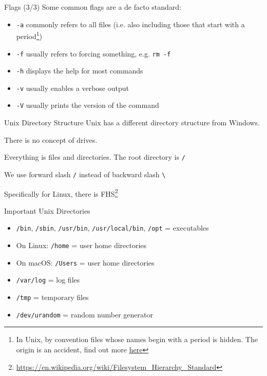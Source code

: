 \documentclass[12pt]{beamer}
\begin{document}
\begin{frame}[fragile]{Flags (3/3)}
  Some common flags are a de facto standard:
  \begin{itemize}
    \item \texttt{-a} commonly refers to all files (i.e. also including those that start with a period\footnote{In Unix, by convention files whose names begin with a period is hidden. The origin is an accident, find out more \href{https://web.archive.org/web/20150310215704if_/https://plus.google.com/+RobPikeTheHuman/posts/R58WgWwN9jp}{\underline{here}}})
    \item \texttt{-f} usually refers to forcing something, e.g. \texttt{rm -f}
    \item \texttt{-h} displays the help for most commands
    \item \texttt{-v} usually enables a verbose output
    \item \texttt{-V} usually prints the version of the command
  \end{itemize}
\end{frame}

\begin{frame}{Unix Directory Structure}
  Unix has a different directory structure from Windows.

  There is no concept of drives.

  Everything is files and directories. The root directory is \texttt{/}

  We use forward slash \texttt{/} instead of backward slash \texttt{\textbackslash}

  Specifically for Linux, there is FHS\footnote{\url{https://en.wikipedia.org/wiki/Filesystem_Hierarchy_Standard}}
\end{frame}

\begin{frame}{Important Unix Directories}
  \begin{itemize}
    \item \texttt{/bin}, \texttt{/sbin}, \texttt{/usr/bin}, \texttt{/usr/local/bin}, \texttt{/opt} = executables
    \item On Linux: \texttt{/home} = user home directories
    \item On macOS: \texttt{/Users} = user home directories
    \item \texttt{/var/log} = log files
    \item \texttt{/tmp} = temporary files
    \item \texttt{/dev/urandom} = random number generator
  \end{itemize}
\end{frame}
\end{document}
